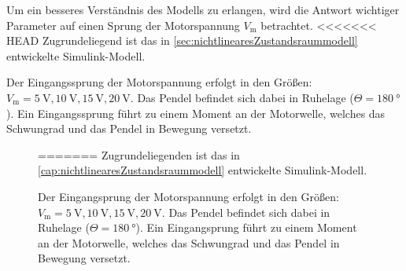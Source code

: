 Um ein besseres Verständnis des Modells zu erlangen, wird die Antwort wichtiger Parameter auf einen Sprung der Motorspannung $V_{\mathrm{m}}$ betrachtet.
<<<<<<< HEAD
Zugrundeliegend ist das in \ref{sec:nichtlinearesZustandsraummodell} entwickelte Simulink-Modell.

Der Eingangssprung der Motorspannung erfolgt in den Größen: $V_{\mathrm{m}}=\SI{5}{\volt},\SI{10}{\volt},\SI{15}{\volt},\SI{20}{\volt}$.
Das Pendel befindet sich dabei in Ruhelage ($\Theta=\SI{180}{\degree}$). 
Ein Eingangssprung führt zu einem Moment an der Motorwelle, welches das Schwungrad und das Pendel in Bewegung versetzt.\\

\begin{figure}
=======
Zugrundeliegenden ist das in\,\ref{cap:nichtlinearesZustandsraummodell} entwickelte Simulink-Modell.

Der Eingangsprung der Motorspannung erfolgt in den Größen: $V_{\mathrm{m}}=\SI{5}{\volt},\SI{10}{\volt},\SI{15}{\volt},\SI{20}{\volt}$.
Das Pendel befindet sich dabei in Ruhelage ($\Theta=\SI{180}{\degree}$). 
Ein Eingangsprung führt zu einem Moment an der Motorwelle, welches das Schwungrad und das Pendel in Bewegung versetzt.\\


\end{figure}
